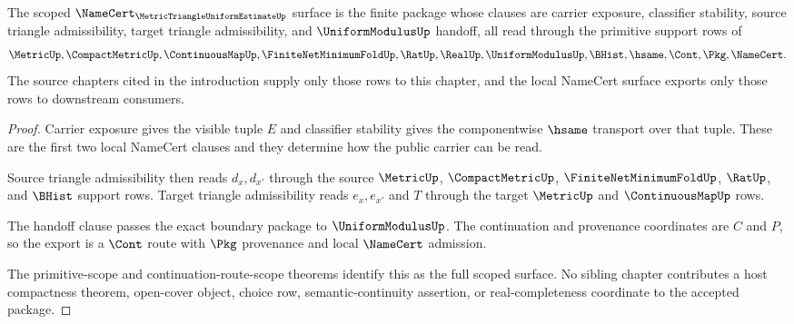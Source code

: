 \begin{theorem}
\label{thm:metric-triangle-uniform-estimate-namecert-scope}
The scoped $\NameCert_{\MetricTriangleUniformEstimateUp}$ surface is the finite package whose clauses are carrier exposure, classifier stability, source triangle admissibility, target triangle admissibility, and $\UniformModulusUp$ handoff, all read through the primitive support rows of
$$
\MetricUp,\CompactMetricUp,\ContinuousMapUp,\FiniteNetMinimumFoldUp,\RatUp,\RealUp,\UniformModulusUp,\BHist,\hsame,\Cont,\Pkg,\NameCert.
$$
The source chapters cited in the introduction supply only those rows to this chapter, and the local NameCert surface exports only those rows to downstream consumers.
\end{theorem}
\begin{proof}
Carrier exposure gives the visible tuple $E$ and classifier stability gives the componentwise $\hsame$ transport over that tuple. These are the first two local NameCert clauses and they determine how the public carrier can be read.

Source triangle admissibility then reads $d_x,d_{x'}$ through the source $\MetricUp$, $\CompactMetricUp$, $\FiniteNetMinimumFoldUp$, $\RatUp$, and $\BHist$ support rows. Target triangle admissibility reads $e_x,e_{x'}$ and $T$ through the target $\MetricUp$ and $\ContinuousMapUp$ rows.

The handoff clause passes the exact boundary package to $\UniformModulusUp$. The continuation and provenance coordinates are $C$ and $P$, so the export is a $\Cont$ route with $\Pkg$ provenance and local $\NameCert$ admission.

The primitive-scope and continuation-route-scope theorems identify this as the full scoped surface. No sibling chapter contributes a host compactness theorem, open-cover object, choice row, semantic-continuity assertion, or real-completeness coordinate to the accepted package.
\end{proof}

